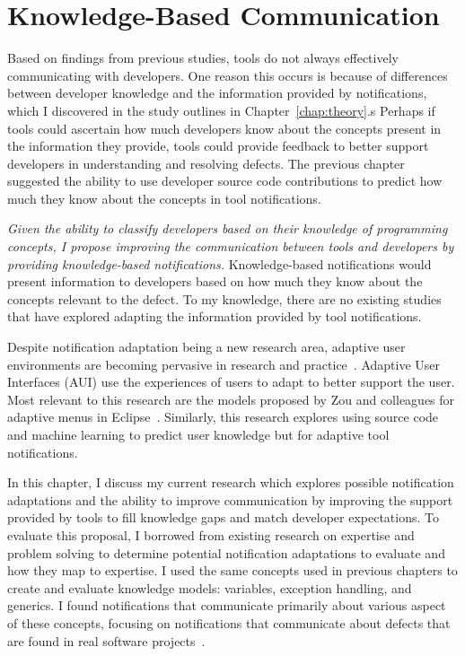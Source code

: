 \chapter{Knowledge-Based Communication}
\label{chap:improve}

Based on findings from previous studies, tools do not always effectively communicating with developers.
One reason this occurs is because of differences between developer knowledge and the information provided by notifications, which I discovered in the study outlines in Chapter~\ref{chap:theory}.s
Perhaps if tools could ascertain how much developers know about the concepts present in the information they provide, tools could provide feedback to better support developers in understanding and resolving defects.
The previous chapter suggested the ability to use developer source code contributions to predict how much they know about the concepts in tool notifications.

\textit{Given the ability to classify developers based on their knowledge of programming concepts, I propose improving the communication between tools and developers by providing knowledge-based notifications.}
Knowledge-based notifications would present information to developers based on how much they know about the concepts relevant to the defect.
To my knowledge, there are no existing studies that have explored adapting the information provided by tool notifications.

Despite notification adaptation being a new research area, adaptive user environments are becoming pervasive in research and practice~\cite{zou2008adapting, amershi2007unsupervised, stamper2009unsupervised}. 
Adaptive User Interfaces (AUI) use the experiences of users to adapt to better support the user.
Most relevant to this research are the models proposed by Zou and colleagues for adaptive menus in Eclipse~\cite{zou2008adapting}.
Similarly, this research explores using source code and machine learning to predict user knowledge but for adaptive tool notifications.


In this chapter, I discuss my current research which explores possible notification adaptations and the ability to improve communication by improving the support provided by tools to fill knowledge gaps and match developer expectations. 
To evaluate this proposal, I borrowed from existing research on expertise and problem solving to determine potential notification adaptations to evaluate and how they map to expertise.
I used the same concepts used in previous chapters to create and evaluate knowledge models: variables, exception handling, and generics.
I found notifications that communicate primarily about various aspect of these concepts, focusing on notifications that communicate about defects that are found in real software projects~\cite{ayewah2007evaluating, zheng2006value}.

